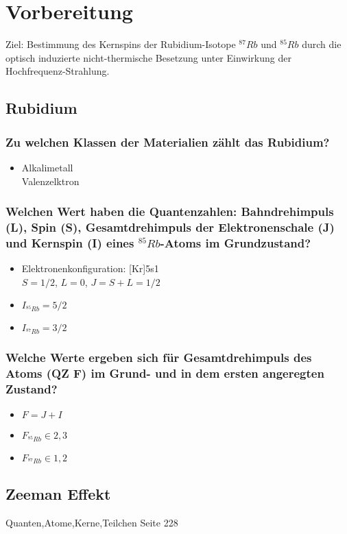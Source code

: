 \section{Vorbereitung}
Ziel: Bestimmung des Kernspins der Rubidium-Isotope $^{87}Rb$ und $^{85}Rb$ durch die optisch induzierte nicht-thermische Besetzung unter
Einwirkung der Hochfrequenz-Strahlung. 

\subsection{Rubidium}
\subsubsection[]{Zu welchen Klassen der Materialien zählt das Rubidium?}
\begin{itemize}
    \item Alkalimetall\\
     Valenzelktron
\end{itemize}
\subsubsection[]{Welchen Wert haben die Quantenzahlen: Bahndrehimpuls (L), Spin (S), Gesamtdrehimpuls der Elektronenschale (J) und Kernspin (I) eines $^{85}Rb$-Atoms im Grundzustand?}
\begin{itemize}
    \item Elektronenkonfiguration: [Kr]5s1 \\
    \to $S=1/2$, $L=0$, $J=S+L=1/2$
    \item $I_{^{85}Rb}=5/2$
    \item $I_{^{87}Rb}=3/2$
\end{itemize}
\subsubsection[]{Welche Werte ergeben sich für Gesamtdrehimpuls des Atoms (QZ F) im Grund- und in dem ersten angeregten Zustand?}
\begin{itemize}
    \item $F=J+I$
    \item $F_{^{85}Rb}\in {2,3}$
    \item $F_{^{87}Rb}\in {1,2}$
\end{itemize}

\subsection{Zeeman Effekt}
Quanten,Atome,Kerne,Teilchen Seite 228
